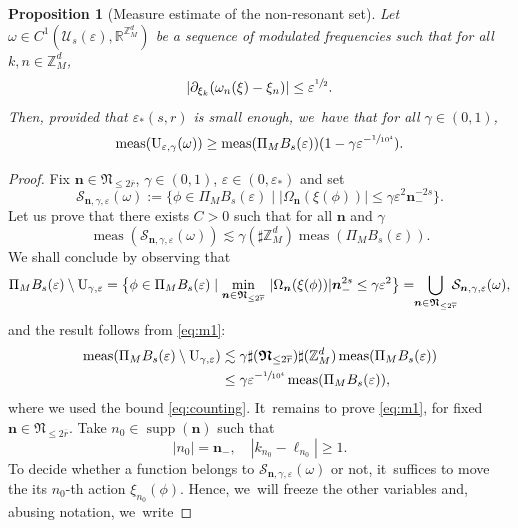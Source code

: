 \documentclass[10pt,a4paper]{amsart}
\theoremstyle{plain}
\newtheorem{proposition}[theorem]{Proposition}
\theoremstyle{definition}
\DeclareMathOperator{\meas}{meas}
\DeclareMathOperator{\supp}{supp}
\newcommand{\nb}{{\boldsymbol n}}
\newcommand{\Nb}{{\boldsymbol{\mathfrak{N}}}}
\newcommand{\Z}{\mathbb{Z}}
\newcommand{\R}{\mathbb{R}}
\newcommand{\1}{\mathbf{1}}
\let\epsilon\varepsilon
\providecommand{\skpt}{\smallskip}
\begin{document}
\skpt
\begin{proposition}[Measure estimate of the non-resonant set]
\label{prop:modulation}
Let $\omega \in C^{1}(\mathcal{U}_{s}(\epsilon), \R^{\Z_{M}^{d}})$ be a sequence of modulated frequencies such that for all $k,n\in\Z_{M}^{d}$,
\begin{equation}
\label{eq:as-omega}
|\partial_{\xi_{k}}(\omega_n(\xi) -\xi_{n})|\leq \epsilon^{\sfrac{1}{2}}.
\end{equation}
Then, provided that $\epsilon_{\ast}(s,r)$ is small enough, we~have that for all $\gamma\in(0,1)$,
\[
\meas(\operatorname{U}_{\epsilon,\gamma}(\omega)) \geq \meas(\Pi_{M}B_{s}(\epsilon))(1-\gamma \epsilon^{-\sfrac{1}{10^{4}}}).
\]
\end{proposition}
\begin{proof}
Fix $\nb\in\Nb_{\leq2\overline{r}}$, $\gamma\in(0,1)$, $\epsilon\in(0,\epsilon_{\ast})$ and set
\[
\mathcal{S}_{\nb,\gamma,\epsilon}(\omega)
:= \Big\{\phi\in\Pi_{M}B_s(\epsilon)\mid |\Omega_\nb(\xi(\phi))|
\leq \gamma\epsilon^2\nb_-^{-2s}\Big\}.
\]
Let us prove that there exists $C>0$ such that for all $\nb$ and $\gamma$
\begin{equation}
\label{eq:m1}
\meas(\mathcal{S}_{\nb,\gamma,\epsilon}(\omega))
\lesssim\gamma(\sharp\Z_{M}^{d})\meas(\Pi_{M}B_s(\epsilon)).
\end{equation}
We shall conclude by observing that
\[
\Pi_{M}B_{s}(\epsilon)
\setminus\operatorname{U}_{\gamma,\epsilon}
= \big\{\phi\in\Pi_{M}B_s(\epsilon) \mid \underset{\nb\in\Nb_{\leq2\overline{r}}}{\min}\ |\Omega_\nb(\xi(\phi))|\nb_-^{2s}\leq\gamma\epsilon^2\big\}
= \hspace*{-1mm}\bigcup_{\nb\in\Nb_{\leq2\overline{r}}}\hspace*{-2mm}\mathcal{S}_{\nb,\gamma,\epsilon}(\omega),
\]
and the result follows from \eqref{eq:m1}:
\begin{align*}
\meas(\Pi_{M}B_{s}(\epsilon)
\setminus\operatorname{U}_{\gamma,\epsilon})
&\lesssim \gamma
\sharp(\Nb_{\leq2\overline{r}})\sharp(\Z_{M}^{d})
\meas(\Pi_{M}B_s(\epsilon)) \\
&\leq \gamma \epsilon^{-\sfrac{1}{10^{4}}}
\meas(\Pi_{M}B_s(\epsilon)),
\end{align*}
where we used the bound \eqref{eq:counting}. It~remains to prove \eqref{eq:m1}, for fixed $\nb\in\Nb_{\leq2\overline{r}}$. Take $n_0\in\supp(\nb)$ such that
\[
|n_0| = \nb_-,\quad |k_{n_{0}}-\ell_{n_{0}}|\geq1.
\]
To decide whether a function belongs to $\mathcal{S}_{\nb,\gamma,\epsilon}(\omega)$ or not, it~suffices to move the its $n_{0}$-th action $\xi_{n_0}(\phi)$. Hence, we~will freeze the other variables and, abusing notation, we~write

\end{proof}
\end{document}

